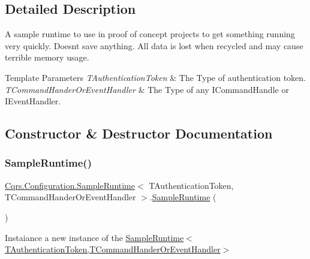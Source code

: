 \subsection{Detailed Description}
A sample runtime to use in proof of concept projects to get something running very quickly. Doesn\textquotesingle{}t save anything. All data is lost when recycled and may cause terrible memory usage. 


\begin{DoxyTemplParams}{Template Parameters}
{\em T\+Authentication\+Token} & The Type of authentication token.\\
\hline
{\em T\+Command\+Hander\+Or\+Event\+Handler} & The Type of any I\+Command\+Handle or I\+Event\+Handler.\\
\hline
\end{DoxyTemplParams}


\subsection{Constructor \& Destructor Documentation}
\mbox{\label{classCqrs_1_1Configuration_1_1SampleRuntime_a9382e8b20b8701815ad20c1cd645c27b_a9382e8b20b8701815ad20c1cd645c27b}} 
\subsubsection{\texorpdfstring{Sample\+Runtime()}{SampleRuntime()}}
{\footnotesize\ttfamily \hyperlink{classCqrs_1_1Configuration_1_1SampleRuntime}{Cqrs.\+Configuration.\+Sample\+Runtime}$<$ T\+Authentication\+Token, T\+Command\+Hander\+Or\+Event\+Handler $>$.\hyperlink{classCqrs_1_1Configuration_1_1SampleRuntime}{Sample\+Runtime} (\begin{DoxyParamCaption}{ }\end{DoxyParamCaption})}



Instaiance a new instance of the \hyperlink{classCqrs_1_1Configuration_1_1SampleRuntime_a9382e8b20b8701815ad20c1cd645c27b_a9382e8b20b8701815ad20c1cd645c27b}{Sample\+Runtime$<$\+T\+Authentication\+Token,\+T\+Command\+Hander\+Or\+Event\+Handler$>$} 



